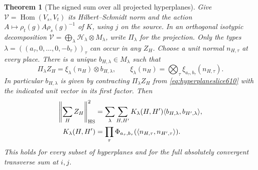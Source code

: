 \documentclass[a4paper,11pt]{article}
\newtheorem{theorem}[proposition]{Theorem}
\theoremstyle{definition}
\theoremstyle{remark}
\numberwithin{equation}{section}
\begin{document}
\begin{theorem}[The signed sum over all projected hyperplanes]
\leavevmode\label{thm:hyperplanesum610}
Give \(\mathcal V=\operatorname{Hom}(V_s,V_t)\) its
Hilbert--Schmidt norm and the action
\(A\mapsto\rho_t(g)A\rho_s(g)^{-1}\) of \(K\), using \(j\) on
the source. In an orthogonal isotypic decomposition
\(\mathcal V=\bigoplus_\lambda \mathcal H_\lambda\otimes M_\lambda\),
write \(\Pi_\lambda\) for the projection. Only the types
\(\lambda=((a_\tau,0,\ldots,0,-b_\tau))_\tau\) can occur in
any \(Z_H\). Choose a unit normal \(n_{H,\tau}\) at every place.
There is a unique \(b_{H,\lambda}\in M_\lambda\) such that
\[
  \Pi_\lambda Z_H=\xi_\lambda(n_H)\otimes b_{H,\lambda},\qquad
  \xi_\lambda(n_H)=\bigotimes_\tau
                       \xi_{a_\tau,b_\tau}(n_{H,\tau}).
\]
In particular \(b_{H,\lambda}\) is given by contracting
\(\Pi_\lambda Z_H\) from \eqref{eq:hyperplaneslice610} with the
indicated unit vector in its first factor. Then
\begin{equation}
 \begin{split}
  \left\|\sum_H Z_H\right\|_{\rm HS}^2
   &=\sum_{\lambda}\sum_{H,H'}K_\lambda(H,H')
                      \langle b_{H,\lambda},b_{H',\lambda}\rangle,\\
  K_\lambda(H,H')&=\prod_\tau
       \Phi_{a_\tau,b_\tau}(\langle n_{H,\tau},n_{H',\tau}\rangle).
 \end{split}
 \label{eq:sumallplanes610}
\end{equation}
This holds for every subset of hyperplanes and for the full
absolutely convergent transverse sum at \(i,j\).
\end{theorem}
\end{document}
